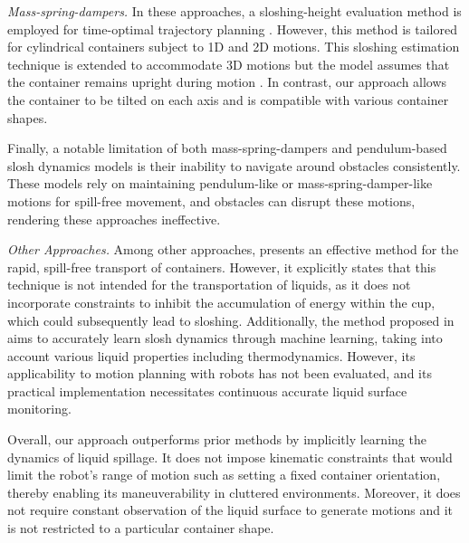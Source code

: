 \textit{Mass-spring-dampers.} In these approaches, a sloshing-height evaluation method is employed for time-optimal trajectory planning \cite{springdamper2021}. However, this method is tailored for cylindrical containers subject to 1D and 2D motions. This sloshing estimation technique is extended to accommodate 3D motions but the model assumes that the container remains upright during motion \cite{springdamper2022}. In contrast, our approach allows the container to be tilted on each axis and is compatible with various container shapes.


Finally, a notable limitation of both mass-spring-dampers and pendulum-based slosh dynamics models is their inability to navigate around obstacles consistently. These models rely on maintaining pendulum-like or mass-spring-damper-like motions for spill-free movement, and obstacles can disrupt these motions, rendering these approaches ineffective.


\textit{Other Approaches.} 
Among other approaches, \cite{gompfit} presents an effective method for the rapid, spill-free transport of containers. However, it explicitly states that this technique is not intended for the transportation of liquids, as it does not incorporate constraints to inhibit the accumulation of energy within the cup, which could subsequently lead to sloshing.
Additionally, the method proposed in \cite{sloshbydata} aims to accurately learn slosh dynamics through machine learning, taking into account various liquid properties including thermodynamics. However, its applicability to motion planning with robots has not been evaluated, and its practical implementation necessitates continuous accurate liquid surface monitoring.


Overall, our approach outperforms prior methods by implicitly learning the dynamics of liquid spillage. It does not impose kinematic constraints that would limit the robot's range of motion such as setting a fixed container orientation, thereby enabling its maneuverability in cluttered environments. Moreover, it does not require constant observation of the liquid surface to generate motions and it is not restricted to a particular container shape.